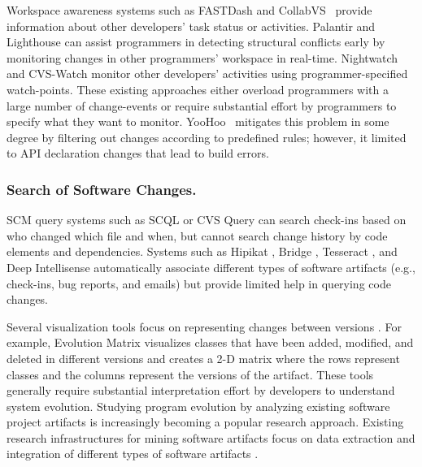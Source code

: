 \documentclass[runningheads,a4paper]{llncs}
\begin{document}
Workspace awareness systems such as FASTDash \cite{Biehl2007} and CollabVS~\cite{Hegde2008:collabVS} provide information about other developers' task status or activities. Palantir \cite{Sarma2003} and Lighthouse \cite{daSilva2006} can assist programmers in detecting structural conflicts early by monitoring changes in other programmers' workspace in real-time. Nightwatch \cite{OReilly2003} and CVS-Watch \cite{Berliner1990:cvs2} monitor other developers' activities using programmer-specified watch-points. These existing approaches either overload programmers with a large number of change-events or require substantial effort by programmers to specify what they want to monitor. YooHoo~\cite{Holmes2010:Yoohoo} mitigates this problem in some degree by filtering out changes according to predefined rules; however, it limited to API declaration changes that lead to build errors. 

\subsubsection{Search of Software Changes.}
SCM query systems such as SCQL \cite{Hindle2005} or CVS Query \cite{bonsai} can search check-ins based on who changed which file and when, but cannot search change history by code elements and dependencies. Systems such as Hipikat \cite{Hipikat}, Bridge \cite{Venolia2006:bridge}, Tesseract \cite{Tesseract}, and Deep Intellisense \cite{Holmes2008:intellisense} automatically associate different types of software artifacts (e.g., check-ins, bug reports, and emails) but provide limited help in querying code changes. 

Several visualization tools focus on representing changes between versions \cite{Ball1996,Eick2002,Girba2004,Holt1996,Lanza01:sv,Lanza2003,Rysselberghe2004a}. For example, Evolution Matrix \cite{Lanza01:sv} visualizes classes that have been added, modified, and deleted in different versions and creates a 2-D matrix where the rows represent classes and the columns represent the versions of the artifact. These tools generally require substantial interpretation effort by developers to understand system evolution. Studying program evolution by analyzing existing software project artifacts is increasingly becoming a popular research approach. Existing research infrastructures for mining software artifacts focus on data extraction \cite{Bevan2005,Fischer2003} and integration of different types of software artifacts \cite{Hipikat, Venolia2006:bridge,Tesseract, Begel2010:codebook}. 
\end{document}
